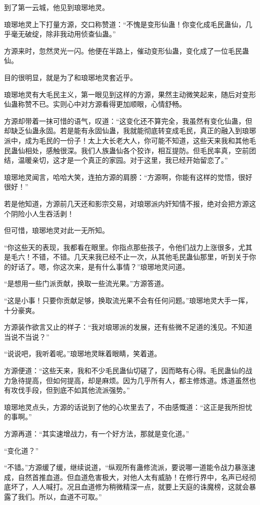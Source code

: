 \begin{this_body}
到了第一云城，他见到琅琊地灵。

琅琊地灵上下打量方源，交口称赞道：“不愧是变形仙蛊！你变化成毛民蛊仙，几乎毫无破绽，除非我动用侦查仙蛊。”

方源来时，忽然灵光一闪。他便在半路上，催动变形仙蛊，变化成了一位毛民蛊仙。

目的很明显，就是为了和琅琊地灵套近乎。

琅琊地灵有大毛民主义，第一眼见到这样的方源，果然主动微笑起来，随后对变形仙蛊称赞不已。实则心中对方源看得更加顺眼，心情舒畅。

方源却带着一抹可惜的语气，叹道：“这变化还不算完全，我虽然有变化仙蛊，但却缺乏仙蛊永固。若是能有永固仙蛊，我就能彻底转变成毛民，真正的融入到琅琊派中，成为毛民的一份子！太上大长老大人，你可能不知道，这些天来我和其他毛民蛊仙相处，感触很深。我们人族蛊仙各个狡诈，相互提防。但毛民率真，空前团结，温暖亲切，这才是一个真正的家园。对于这里，我已经开始留恋了。”

琅琊地灵闻言，哈哈大笑，连拍方源的肩膀：“方源啊，你能有这样的觉悟，很好很好！”

若是他知道，方源前几天还和影宗交易，对琅琊派内奸知情不报，绝对会把方源这个阴险小人生吞活剥！

但可惜，琅琊地灵对此一无所知。

“你这些天的表现，我都看在眼里。你指点那些孩子，令他们战力上涨很多，尤其是毛六！不错，不错。几天来我已经不止一次，从其他毛民蛊仙那里，听到关于你的好话了。嗯，你这次来，是有什么事情？”琅琊地灵问道。

“是想用一些门派贡献，换取一些流光果。”方源答道。

“这是小事！只要你贡献足够，换取流光果不会有任何问题。”琅琊地灵大手一挥，十分豪爽。

方源装作欲言又止的样子：“我对琅琊派的发展，还有些微不足道的浅见。不知道当说不当说？”

“说说吧，我听着呢。”琅琊地灵眯着眼睛，笑着道。

方源便道：“这些天来，我和不少毛民蛊仙切磋了，因而略有心得。毛民蛊仙的战力急待提高，但如何提高，却是麻烦。因为几乎所有人，都主修炼道。炼道虽然也有攻伐手段，但到底不如其他流派强势。”

琅琊地灵点头，方源的话说到了他的心坎里去了，不由感慨道：“这正是我所担忧的事啊。”

方源再道：“其实速增战力，有一个好方法，那就是变化道。”

“变化道？”

“不错。”方源缓了缓，继续说道，“纵观所有蛊修流派，要说哪一道能令战力暴涨速成，自然首推血道。但血道危害极大，对他人太有威胁！在修行界中，名声已经彻底坏了，人人喊打。况且血道修为稍微精深一点，就要上天庭的诛魔榜，这就会暴露了我们。所以，血道不可取。”


\end{this_body}
